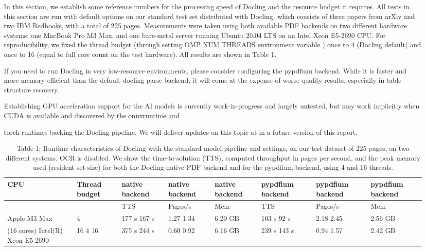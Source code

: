 In this section, we establish some reference numbers for the processing speed of Docling and the resource budget it requires. All tests in this section are run with default options on our standard test set distributed with Docling, which consists of three papers from arXiv and two IBM Redbooks, with a total of 225 pages. Measurements were taken using both available PDF backends on two different hardware systems: one MacBook Pro M3 Max, and one bare-metal server running Ubuntu 20.04 LTS on an Intel Xeon E5-2690 CPU. For reproducibility, we fixed the thread budget (through setting OMP NUM THREADS environment variable ) once to 4 (Docling default) and once to 16 (equal to full core count on the test hardware). All results are shown in Table 1.

If you need to run Docling in very low-resource environments, please consider configuring the pypdfium backend. While it is faster and more memory efficient than the default docling-parse backend, it will come at the expense of worse quality results, especially in table structure recovery.

Establishing GPU acceleration support for the AI models is currently work-in-progress and largely untested, but may work implicitly when CUDA is available and discovered by the onnxruntime and

torch runtimes backing the Docling pipeline. We will deliver updates on this topic at in a future version of this report.

\begin{table}[h]
\caption{Table 1: Runtime characteristics of Docling with the standard model pipeline and settings, on our test dataset of 225 pages, on two different systems. OCR is disabled. We show the time-to-solution (TTS), computed throughput in pages per second, and the peak memory used (resident set size) for both the Docling-native PDF backend and for the pypdfium backend, using 4 and 16 threads.}
\begin{tabular}{|l|l|l|l|l|l|l|l|}
\hline
CPU & Thread budget & native backend & native backend & native backend & pypdfium backend & pypdfium backend & pypdfium backend \\ \hline
 &  & TTS & Pages/s & Mem & TTS & Pages/s & Mem \\ \hline
Apple M3 Max & 4 & 177 s 167 s & 1.27 1.34 & 6.20 GB & 103 s 92 s & 2.18 2.45 & 2.56 GB \\ \hline
(16 cores) Intel(R) Xeon E5-2690 & 16 4 16 & 375 s 244 s & 0.60 0.92 & 6.16 GB & 239 s 143 s & 0.94 1.57 & 2.42 GB \\ \hline
\end{tabular}
\end{table}

